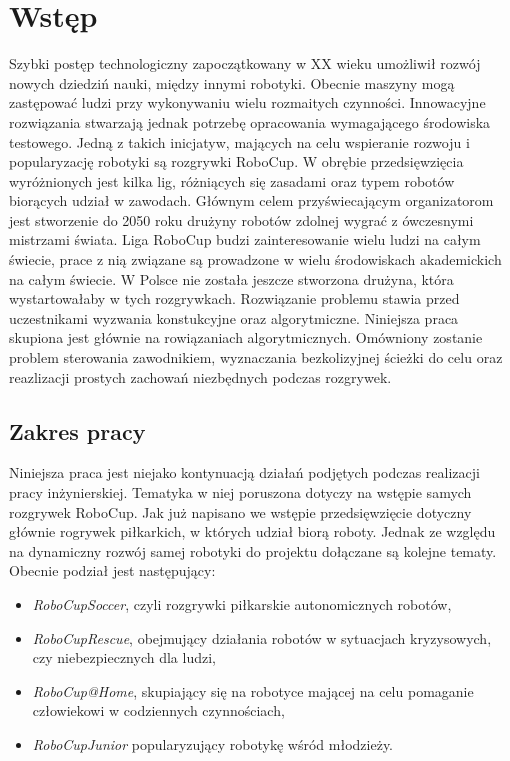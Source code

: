 \chapter[Wstęp ]{Wstęp}
Szybki postęp technologiczny zapoczątkowany w XX wieku umożliwił rozwój nowych dziedziń nauki, między innymi robotyki. Obecnie maszyny mogą zastępować ludzi przy wykonywaniu wielu rozmaitych czynności.
Innowacyjne rozwiązania stwarzają jednak potrzebę opracowania wymagającego środowiska testowego. Jedną z takich inicjatyw, mających na celu wspieranie rozwoju i popularyzację robotyki są rozgrywki
RoboCup. W obrębie przedsięwzięcia wyróżnionych jest kilka lig, różniących się zasadami oraz typem robotów biorących udział w zawodach.
Głównym celem przyświecającym organizatorom jest stworzenie do 2050 roku drużyny robotów zdolnej wygrać z ówczesnymi mistrzami świata.
Liga RoboCup budzi zainteresowanie wielu ludzi na całym świecie, prace z nią związane  są prowadzone w wielu środowiskach akademickich na całym świecie.
W Polsce nie została jeszcze stworzona drużyna, która wystartowałaby w tych rozgrywkach.
Rozwiązanie problemu stawia przed uczestnikami wyzwania konstukcyjne oraz algorytmiczne. Niniejsza praca skupiona jest głównie na rowiązaniach algorytmicznych. Omówniony zostanie problem sterowania
zawodnikiem, wyznaczania bezkolizyjnej ścieżki do celu oraz reazlizacji prostych zachowań niezbędnych podczas rozgrywek.
\section{Zakres pracy}
Niniejsza praca jest niejako kontynuacją działań podjętych podczas realizacji pracy inżynierskiej. Tematyka w niej poruszona dotyczy na wstępie samych rozgrywek RoboCup. Jak już napisano we 
wstępie przedsięwzięcie dotyczny głównie rogrywek piłkarkich, w których udział biorą roboty. Jednak ze względu na dynamiczny rozwój samej robotyki do projektu dołączane są kolejne tematy.
Obecnie podział jest następujący:
\begin{itemize}
	\item \emph{RoboCupSoccer}, czyli rozgrywki piłkarskie autonomicznych robotów,
	\item \emph{RoboCupRescue}, obejmujący działania robotów w sytuacjach kryzysowych, czy niebezpiecznych dla ludzi,
	\item \emph{RoboCup@Home}, skupiający się na robotyce mającej na celu pomaganie człowiekowi w codziennych czynnościach,
	\item \emph{RoboCupJunior} popularyzujący robotykę wśród młodzieży.
\end{itemize}

